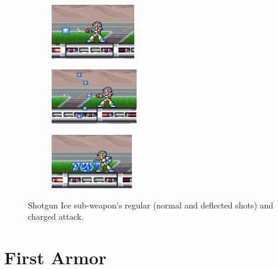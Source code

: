 \begin{figure}[htp]
	\centering
	\begin{subfigure}{0.3\linewidth}
		\includegraphics[height=2.4cm]{figures/X1/weapons/Shotgun_ice_1.jpg}
	\end{subfigure}
	\begin{subfigure}{0.31\linewidth}
		\includegraphics[height=2.4cm]{figures/X1/weapons/Shotgun_ice_2.jpg}
	\end{subfigure}
	\begin{subfigure}{0.29\linewidth}
		\includegraphics[height=2.4cm]{figures/X1/weapons/Shotgun_ice_3.jpg}
	\end{subfigure}
	\caption{Shotgun Ice sub-weapon's regular (normal and deflected shots) and charged attack.}
\end{figure}

\section{First Armor}\label{X1:Armor}

